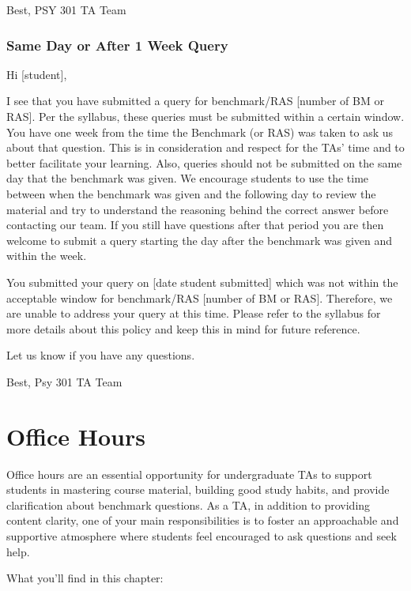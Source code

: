\documentclass[
]{article}
\begin{document}
Best,
PSY 301 TA Team

\hypertarget{same-day-or-after-1-week-query}{%
\subsubsection{Same Day or After 1 Week Query}\label{same-day-or-after-1-week-query}}

Hi {[}student{]},

I see that you have submitted a query for benchmark/RAS {[}number of BM or RAS{]}. Per the syllabus, these queries must be submitted within a certain window. You have one week from the time the Benchmark (or RAS) was taken to ask us about that question. This is in consideration and respect for the TAs' time and to better facilitate your learning. Also, queries should not be submitted on the same day that the benchmark was given. We encourage students to use the time between when the benchmark was given and the following day to review the material and try to understand the reasoning behind the correct answer before contacting our team. If you still have questions after that period you are then welcome to submit a query starting the day after the benchmark was given and within the week.

You submitted your query on {[}date student submitted{]} which was not within the acceptable window for benchmark/RAS {[}number of BM or RAS{]}. Therefore, we are unable to address your query at this time. Please refer to the syllabus for more details about this policy and keep this in mind for future reference.

Let us know if you have any questions.

Best,
Psy 301 TA Team

\hypertarget{office-hours}{%
\section{Office Hours}\label{office-hours}}

Office hours are an essential opportunity for undergraduate TAs to support students in mastering course material, building good study habits, and provide clarification about benchmark questions. As a TA, in addition to providing content clarity, one of your main responsibilities is to foster an approachable and supportive atmosphere where students feel encouraged to ask questions and seek help.

What you'll find in this chapter:
\end{document}
